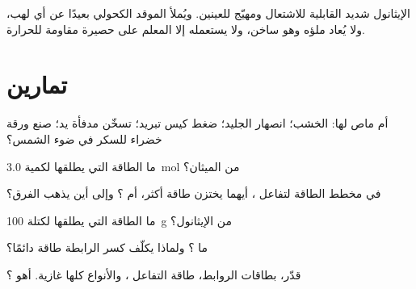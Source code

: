 \begin{safety}{}
الإيثانول شديد القابلية للاشتعال ومهيّج للعينين. ويُملأ الموقد الكحولي
بعيدًا عن أي لهب، ولا يُعاد ملؤه وهو ساخن، ولا يستعمله إلا
المعلم على حصيرة مقاومة للحرارة.
\end{safety}

\section{تمارين}


\begin{exercise}[$\star$]\label{exo:g11:reaction-energy:1}
 أم ماص لها:  الخشب؛ انصهار الجليد؛ ضغط كيس
تبريد؛ تسخّن مدفأة يد؛ صنع ورقة خضراء للسكر في
ضوء الشمس؟
\end{exercise}

\begin{exercise}[$\star$]\label{exo:g11:reaction-energy:2}
ما الطاقة التي يطلقها  لكمية \qty{3.0}{mol} من الميثان؟
\end{exercise}

\begin{exercise}[$\star$]\label{exo:g11:reaction-energy:3}
في مخطط الطاقة لتفاعل ، أيهما يختزن طاقة
أكثر،  أم ؟ وإلى أين يذهب الفرق؟
\end{exercise}

\begin{exercise}[$\star$]\label{exo:g11:reaction-energy:4}
ما الطاقة التي يطلقها  لكتلة \qty{100}{g} من الإيثانول؟
\end{exercise}

\begin{exercise}[$\star$]\label{exo:g11:reaction-energy:5}
ما ؟ ولماذا يكلّف كسر الرابطة طاقة دائمًا؟
\end{exercise}

\begin{exercise}[$\star\star$]\label{exo:g11:reaction-energy:6}
قدّر، بطاقات الروابط، طاقة التفاعل
، والأنواع كلها غازية. أهو ؟
\end{exercise}

